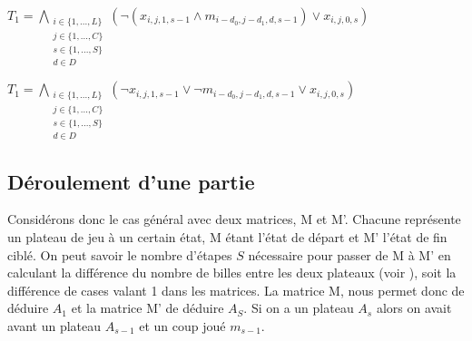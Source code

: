\documentclass[utf8]{article}
\begin{document}
$T_1 = {\underset{\substack{i\in\{1,...,L\} \\ j\in\{1,...,C\} \\ s\in \{1,...,S\}\\ d \in D}}{\bigwedge}}(\neg(x_{i,j,1,s-1} \wedge m_{i-d_0,j-d_1,d,s-1})\vee x_{i,j,0,s})$\newline

$T_1 = {\underset{\substack{i\in\{1,...,L\} \\ j\in\{1,...,C\} \\ s\in \{1,...,S\}\\ d \in D}}{\bigwedge}}(\neg x_{i,j,1,s-1} \vee \neg m_{i-d_0,j-d_1,d,s-1}\vee x_{i,j,0,s})$\newline

\subsection{Déroulement d'une partie}
Considérons donc le cas général avec deux matrices, M et M'. Chacune représente un plateau de jeu à un certain état, M étant l'état de départ et M' l'état de fin ciblé. On peut savoir le nombre d'étapes $S$ nécessaire pour passer de M à M' en calculant la différence du nombre de billes entre les deux plateaux (voir \textbf{}), soit la différence de cases valant 1 dans les matrices.
\newline
La matrice M, nous permet donc de déduire $A_1$ et la matrice M' de déduire $A_S$.
\newline
Si on a un plateau $A_s$ alors on avait avant un plateau $A_{s-1}$ et un coup joué $m_{s-1}$. 
\end{document}
